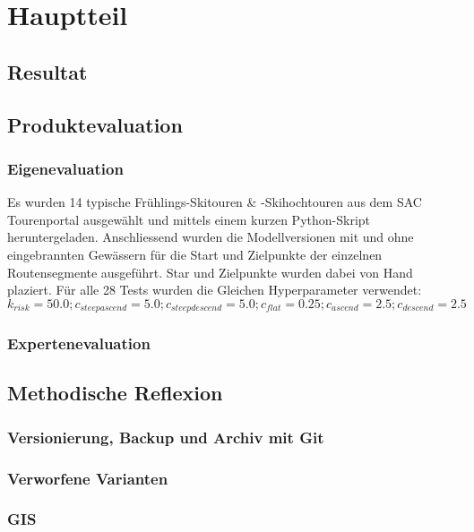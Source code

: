\section{Hauptteil}
\subsection{Resultat}

\subsection{Produktevaluation}
\subsubsection{Eigenevaluation}

Es wurden 14 typische Frühlings-Skitouren \& -Skihochtouren aus dem SAC Tourenportal ausgewählt und mittels einem kurzen Python-Skript heruntergeladen. Anschliessend wurden die Modellversionen mit und ohne eingebrannten Gewässern für die Start und Zielpunkte der einzelnen Routensegmente ausgeführt. Star und Zielpunkte wurden dabei von Hand plaziert. Für alle 28 Tests wurden die Gleichen Hyperparameter verwendet: $k_{risk}={50.0}; c_{steepascend}={5.0}; c_{steepdescend}={5.0}; c_{flat}={0.25}; c_{ascend}={2.5}; c_{descend}={2.5}$




\subsubsection{Expertenevaluation}

\subsection{Methodische Reflexion}
\subsubsection{Versionierung, Backup und Archiv mit Git}
\subsubsection{Verworfene Varianten}
\subsubsection{GIS}